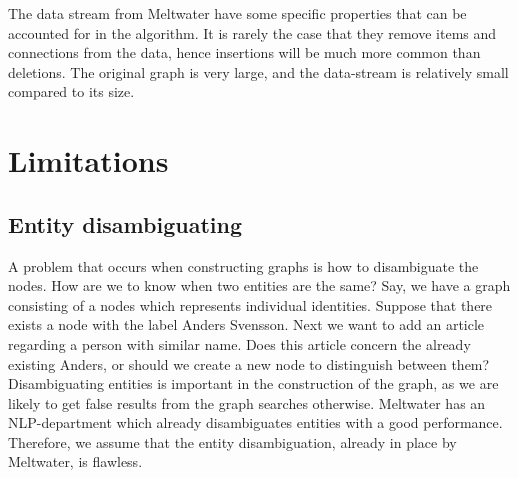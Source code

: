 The data stream from Meltwater have some specific properties that can be accounted for in the algorithm. It is rarely the case that they remove items and connections from the data, hence insertions will be much more common than deletions. The original graph is very large, and the data-stream is relatively small compared to its size. 

\section{Limitations}
\subsection{Entity disambiguating}
A problem that occurs when constructing graphs is how to disambiguate the nodes. How are we to know when two entities are the same? Say, we have a graph consisting of a nodes which represents individual identities. Suppose that there exists a node with the label Anders Svensson. Next we want to add an article regarding a person with similar name. Does this article concern the already existing Anders, or should we create a new node to distinguish between them? Disambiguating entities is important in the construction of the graph, as we are likely to get false results from the graph searches otherwise. Meltwater has an NLP-department which already disambiguates entities with a good performance. Therefore, we assume that the entity disambiguation, already in place by Meltwater, is flawless. 